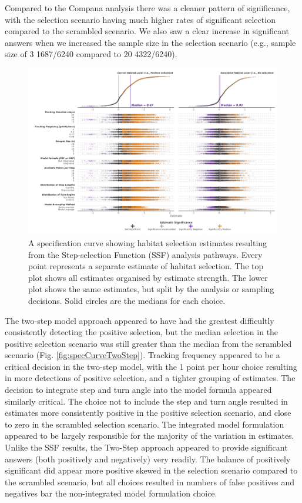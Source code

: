 \documentclass[10pt,a4paper]{article}
\begin{document}
Compared to the Compana analysis there was a cleaner pattern of significance, with the selection scenario having much higher rates of significant selection compared to the scrambled scenario.
We also saw a clear increase in significant answers when we increased the sample size in the selection scenario (e.g., sample size of 3 1687/6240 compared to 20 4322/6240).

\begin{figure}
\includegraphics[width=1\linewidth]{../figures/ssf_specCurve} \caption{A specification curve showing habitat selection estimates resulting from the Step-selection Function (SSF) analysis pathways. Every point represents a separate estimate of habitat selection. The top plot shows all estimates organised by estimate strength. The lower plot shows the same estimates, but split by the analysis or sampling decisions. Solid circles are the medians for each choice.}\label{fig:specCurveSSF}
\end{figure}

The two-step model approach appeared to have had the greatest difficultly consistently detecting the positive selection, but the median selection in the positive selection scenario was still greater than the median from the scrambled scenario (Fig. \ref{fig:specCurveTwoStep}).
Tracking frequency appeared to be a critical decision in the two-step model, with the 1 point per hour choice resulting in more detections of positive selection, and a tighter grouping of estimates.
The decision to integrate step and turn angle into the model formula appeared similarly critical.
The choice not to include the step and turn angle resulted in estimates more consistently positive in the positive selection scenario, and close to zero in the scrambled selection scenario.
The integrated model formulation appeared to be largely responsible for the majority of the variation in estimates.
Unlike the SSF results, the Two-Step approach appeared to provide significant answers (both positively and negatively) very readily.
The balance of positively significant did appear more positive skewed in the selection scenario compared to the scrambled scenario, but all choices resulted in numbers of false positives and negatives bar the non-integrated model formulation choice.
\end{document}
